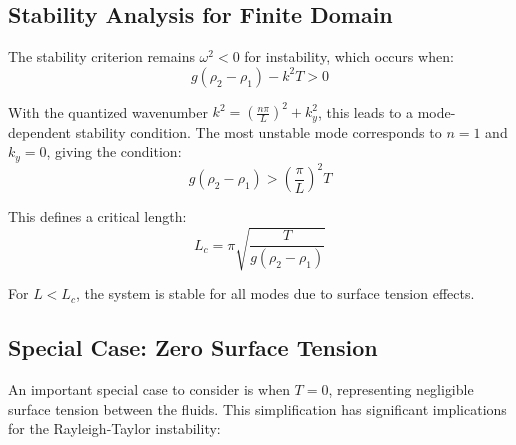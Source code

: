 \documentclass[12pt,a4paper]{article}
\begin{document}
\subsection{Stability Analysis for Finite Domain}
The stability criterion remains $\omega^2 < 0$ for instability, which occurs when:
\begin{equation}
g(\rho_2 - \rho_1) - k^2T > 0
\end{equation}

With the quantized wavenumber $k^2 = \left(\frac{n\pi}{L}\right)^2 + k_y^2$, this leads to a mode-dependent stability condition. The most unstable mode corresponds to $n = 1$ and $k_y = 0$, giving the condition:
\begin{equation}
g(\rho_2 - \rho_1) > \left(\frac{\pi}{L}\right)^2 T
\end{equation}

This defines a critical length:
\begin{equation}
L_c = \pi\sqrt{\frac{T}{g(\rho_2 - \rho_1)}}
\end{equation}

For $L < L_c$, the system is stable for all modes due to surface tension effects.

\subsection{Special Case: Zero Surface Tension}
An important special case to consider is when $T = 0$, representing negligible surface tension between the fluids. This simplification has significant implications for the Rayleigh-Taylor instability:
\end{document}
